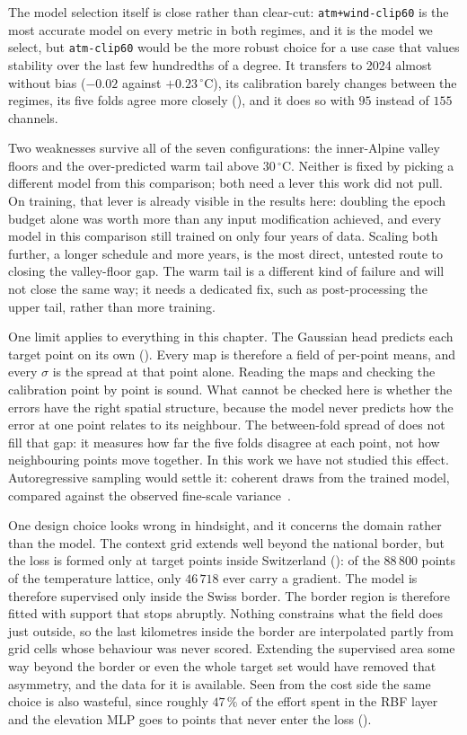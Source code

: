 The model selection itself is close rather than clear-cut: \texttt{atm+wind-clip60} is the most accurate model on every metric in both regimes, and it is the model we select, but \texttt{atm-clip60} would be the more robust choice for a use case that values stability over the last few hundredths of a degree. It transfers to 2024 almost without bias ($-0.02$ against $+0.23\,^{\circ}\mathrm{C}$), its calibration barely changes between the regimes, its five folds agree more closely (), and it does so with $95$ instead of $155$ channels.

Two weaknesses survive all of the seven configurations: the inner-Alpine valley floors and the over-predicted warm tail above $30\,^{\circ}\mathrm{C}$. Neither is fixed by picking a different model from this comparison; both need a lever this work did not pull. On training, that lever is already visible in the results here: doubling the epoch budget alone was worth more than any input modification achieved, and every model in this comparison still trained on only four years of data. Scaling both further, a longer schedule and more years, is the most direct, untested route to closing the valley-floor gap. The warm tail is a different kind of failure and will not close the same way; it needs a dedicated fix, such as post-processing the upper tail, rather than more training.

 One limit applies to everything in this chapter. The Gaussian head predicts each target point on its own (). Every map is therefore a field of per-point means, and every $\sigma$ is the spread at that point alone. Reading the maps and checking the calibration point by point is sound. What cannot be checked here is whether the errors have the right spatial structure, because the model never predicts how the error at one point relates to its neighbour. The between-fold spread of  does not fill that gap: it measures how far the five folds disagree at each point, not how neighbouring points move together. In this work we have not studied this effect. Autoregressive sampling would settle it: coherent draws from the trained model, compared against the observed fine-scale variance~\cite{bruinsma2023arcnp}.

One design choice looks wrong in hindsight, and it concerns the domain rather than the model. The context grid extends well beyond the national border, but the loss is formed only at target points inside Switzerland (): of the $88\,800$ points of the temperature lattice, only $46\,718$ ever carry a gradient. The model is therefore supervised only inside the Swiss border. The border region is therefore fitted with support that stops abruptly. Nothing constrains what the field does just outside, so the last kilometres inside the border are interpolated partly from grid cells whose behaviour was never scored. Extending the supervised area some way beyond the border or even the whole target set would have removed that asymmetry, and the data for it is available. Seen from the cost side the same choice is also wasteful, since roughly $47\,\%$ of the effort spent in the RBF layer and the elevation MLP goes to points that never enter the loss ().

